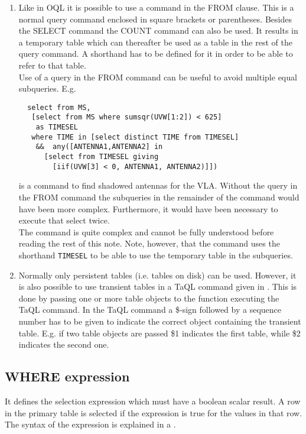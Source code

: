 \begin{enumerate}
\item
Like in OQL it is possible to use a
command in the FROM clause. This is a normal query command
enclosed in square brackets or parentheses. Besides the SELECT command
the COUNT command can also be used.
It results in a temporary table
which can thereafter be used as a table in the rest of the
query command. A shorthand has to be defined for it in order
to be able to refer to that table.
\\Use of a query in the FROM command can be useful to avoid
multiple equal subqueries. E.g.
\begin{verbatim}
  select from MS,
   [select from MS where sumsqr(UVW[1:2]) < 625]
    as TIMESEL
   where TIME in [select distinct TIME from TIMESEL]
    &&  any([ANTENNA1,ANTENNA2] in
      [select from TIMESEL giving
        [iif(UVW[3] < 0, ANTENNA1, ANTENNA2)]])
\end{verbatim}
is a command to find shadowed antennas for the VLA.
Without the query in the FROM command the subqueries in the
remainder of the command would have been more complex.
Furthermore, it would have been necessary to execute that
select twice.
\\The command is quite complex and cannot be fully understood
before reading the rest of this note.
Note, however, that the command uses the shorthand \texttt{TIMESEL}
to be able to use the temporary table in the subqueries.

\item
Normally only persistent tables (i.e. tables on disk) can
be used. However, it is also possible to use transient tables
in a TaQL command given in
.
This is done by passing one or more table objects to the
function executing the TaQL command. In the TaQL command a
\$-sign followed by a sequence number has to be given to
indicate the correct object containing the transient table.
E.g. if two
table objects are passed \$1 indicates the first table, while \$2
indicates the second one.
\end{enumerate}

\subsection{\label{TAQL:WHERE}WHERE expression}
It defines the selection expression which must have a boolean
scalar result. A row in the primary table
is selected if the expression is true for the values in that row.
The syntax of the expression is explained
in a .

